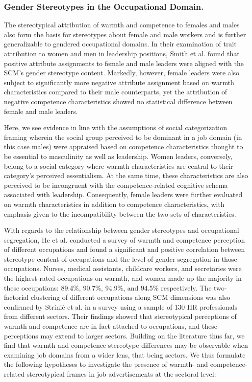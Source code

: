 \documentclass[Royal,sageapa,times]{sagej}
\begin{document}
\subsubsection{Gender Stereotypes in the Occupational Domain.\label{gender_stereotypes_in_the_occupational_domain}}
The stereotypical attribution of warmth and competence to females and males also form the basis for stereotypes about female and male workers  and is further generalizable to gendered occupational domains. In their examination of trait attribution to women and men in leadership positions, Smith et al. \citeyear{smithPowerLanguageGender2019} found that positive attribute assignments to female and male leaders were aligned with the SCM’s gender stereotype content. Markedly, however, female leaders were also subject to significantly more negative attribute assignment based on warmth characteristics compared to their male counterparts, yet the attribution of negative competence characteristics showed no statistical difference between female and male leaders.

Here, we see evidence in line with the assumptions of social categorization framing wherein the social group perceived to be dominant in a job domain (in this case males) were appraised based on competence characteristics thought to be essential to masculinity as well as leadership. Women leaders, conversely, belong to a social category where warmth characteristics are central to their category’s perceived essentialism. At the same time, these characteristics are also perceived to be incongruent with the competence-related cognitive schema associated with leadership. Consequently, female leaders were further evaluated on warmth characteristics in addition to competence characteristics, with emphasis given to the incompatibility between the two sets of characteristics.

With regards to the relationship between gender stereotypes and occupational segregation, He et al. \citeyear{heStereotypesWorkOccupational2019} conducted a survey of warmth and competence perception of different occupations and found a significant and positive correlation between stereotype content of occupations and the level of gender segregation in those occupations. Nurses, medical assistants, childcare workers, and secretaries were the highest-rated occupations on warmth, and women made up the majority in these occupations: 89.4\%, 90.7\%, 94.9\%, and 94.5\% respectively. The two-factorial clustering of different occupations along SCM dimensions was also confirmed by Strinić et al. \citeyear{strinicOccupationalStereotypesProfessionals2021} in a survey using a sample of 130 HR professionals from different sectors. Their findings showed that stereotypical perceptions of warmth and competence are in fact attached to occupations, and these perceptions may extend to larger sectors. Building on the literature thus far, we find that warmth and competence stereotype differences may be observable when examining job domains from a wider lens, that being sectors. We thus formulate the following hypotheses to investigate the presence of warmth- and competence-related stereotypical frames in job advertisements at the sectoral level:
\end{document}
